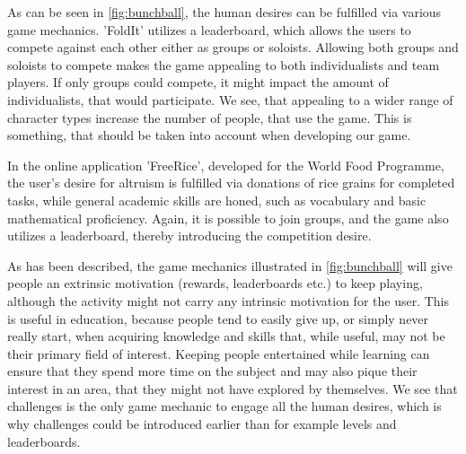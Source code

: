 As can be seen in \autoref{fig:bunchball}, the human desires can be fulfilled via various game mechanics.
'FoldIt' utilizes a leaderboard, which allows the users to compete against each other either as groups or soloists.
Allowing both groups and soloists to compete makes the game appealing to both individualists and team players.
If only groups could compete, it might impact the amount of individualists, that would participate.
We see, that appealing to a wider range of character types increase the number of people, that use the game.
This is something, that should be taken into account when developing our game.\newline

In the online application 'FreeRice', developed for the World Food Programme, the user's desire for altruism is fulfilled via donations of rice grains for completed tasks, while general academic skills are honed, such as vocabulary and basic mathematical proficiency. Again, it is possible to join groups, and the game also utilizes a leaderboard, thereby introducing the competition desire.\cite{freerice}\newline

As has been described, the game mechanics illustrated in \autoref{fig:bunchball} will give people an extrinsic motivation (rewards, leaderboards etc.) to keep playing, although the activity might not carry any intrinsic motivation for the user.
This is useful in education, because people tend to easily give up, or simply never really start, when acquiring knowledge and skills that, while useful, may not be their primary field of interest.
Keeping people entertained while learning can ensure that they spend more time on the subject and may also pique their interest in an area, that they might not have explored by themselves.
We see that challenges is the only game mechanic to engage all the human desires, which is why challenges could be introduced earlier than for example levels and leaderboards.